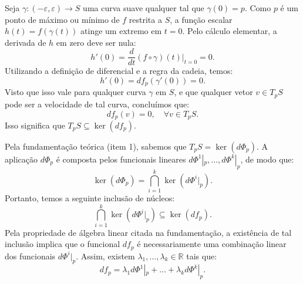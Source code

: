 {	Seja $\gamma : (-\varepsilon, \varepsilon) \to S$ uma curva suave qualquer tal que $\gamma(0)=p$. Como $p$ é um ponto de máximo ou mínimo de $f$ restrita a $S$, a função escalar $h(t) = f(\gamma(t))$ atinge um extremo em $t=0$. Pelo cálculo elementar, a derivada de $h$ em zero deve ser nula:
	\begin{equation*}
		h'(0) = \frac{d}{dt}(f \circ \gamma)(t) \Big|_{t=0} = 0.
	\end{equation*}
	Utilizando a definição de diferencial e a regra da cadeia, temos:
	\begin{equation*}
		h'(0) = df_p(\gamma'(0)) = 0.
	\end{equation*}
	Visto que isso vale para qualquer curva $\gamma$ em $S$, e que qualquer vetor $v \in T_p S$ pode ser a velocidade de tal curva, concluímos que:
	\begin{equation*}
		df_p(v) = 0, \quad \forall v \in T_p S.
	\end{equation*}
	Isso significa que $T_p S \subseteq \ker(df_p)$. 
	
	Pela fundamentação teórica (item 1), sabemos que $T_p S = \ker(d\Phi_p)$. A aplicação $d\Phi_p$ é composta pelos funcionais lineares $d\Phi^1|_p, \dots, d\Phi^k|_p$, de modo que:
	\begin{equation*}
		\ker(d\Phi_p) = \bigcap_{i=1}^k \ker(d\Phi^i|_p).
	\end{equation*}
	Portanto, temos a seguinte inclusão de núcleos:
	\begin{equation*}
		\bigcap_{i=1}^k \ker(d\Phi^i|_p) \subseteq \ker(df_p).
	\end{equation*}
	Pela propriedade de álgebra linear citada na fundamentação, a existência de tal inclusão implica que o funcional $df_p$ é necessariamente uma combinação linear dos funcionais $d\Phi^i|_p$. Assim, existem $\lambda_1, \dots, \lambda_k \in \mathbb{R}$ tais que:
	\begin{equation*}
		df_p = \lambda_1 d\Phi^1|_p + \dots + \lambda_k d\Phi^k|_p.
	\end{equation*}
}


